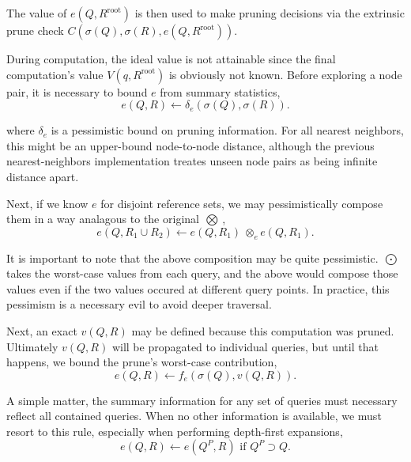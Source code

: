 \documentclass[twoside,leqno,twocolumn]{article}
\newcommand{\authornote}[1]{\footnote{Note to self: #1}}
\newcommand{\union}{\cup}
\newcommand{\summary}{\delta}
\newcommand{\kdroot}[1]{#1^{\text{root}}}
\newcommand{\kdparent}[1]{#1^{\!P}}
\newcommand{\nameOp}[2]{\mathop{#1\nolimits\!\!_{#2}}}
\newcommand{\nameop}[2]{{\scriptstyle\:}#1_{\!#2}}
\newcommand{\myOp}[1]{\nameOp{\bigotimes}{#1}}
\newcommand{\myop}[1]{\nameop{\otimes}{#1}}
\newcommand{\letterqr}{v}
\newcommand{\outqr}{V}
\newcommand{\Opqr}{\myOp{\letterqr}}
\newcommand{\inqrv}{v}
\newcommand{\lettermu}{e}
\newcommand{\inmu}{e}
\newcommand{\Outopmu}{\nameOp{\bigodot}{\lettermu}}%
\newcommand{\opmu}{\myop{\lettermu}}
\newcommand{\fmuv}{f_{\!\lettermu}}
\newcommand{\deltamu}{\summary_{\!\lettermu}}
\newcommand{\canprunemu}{C}
\newcommand{\outstat}{\sigma}
\begin{document}
\noindent
The value of $\inmu(Q, \kdroot{R})$ is then used to make pruning decisions via the extrinsic prune check $\canprunemu(\outstat(Q), \outstat(R), \inmu(Q, \kdroot{R}))$.

During computation, the ideal value is not attainable since the final computation's value $\outqr(q, \kdroot{R})$ is obviously not known.
Before exploring a node pair, it is necessary to bound $\inmu$ from summary statistics,
\begin{equation}
\inmu(Q, R) \gets \deltamu(\outstat(Q), \outstat(R)).
\label{eqn:mudelta}
\end{equation}

\noindent
where $\deltamu$ is a pessimistic bound on pruning information.
For all nearest neighbors, this might be an upper-bound node-to-node distance, although the previous nearest-neighbors implementation treates unseen node pairs as being infinite distance apart.

Next, if we know $\inmu$ for disjoint reference sets, we may pessimistically compose them in a way analagous to the original $\Opqr$,
\begin{equation}
\inmu(Q, R_1 \union R_2) \gets \inmu(Q, R_1) \opmu \inmu(Q, R_1).
\label{eqn:mucompose}
\end{equation}

\noindent
It is important to note that the above composition may be quite pessimistic.
$\Outopmu$ takes the worst-case values from each query, and the above would compose those values even if the two values occured at different query points.
In practice, this pessimism is a necessary evil to avoid deeper traversal.

Next, an exact $\inqrv(Q, R)$ may be defined because this computation was pruned.
Ultimately $\inqrv(Q, R)$ will be propagated to individual queries, but until that happens, we bound the prune's worst-case contribution,
\begin{equation}
\inmu(Q, R) \gets \fmuv(\outstat(Q), \inqrv(Q, R)).
\label{eqn:muprune}
\end{equation}

\noindent
A simple matter, the summary information for any set of queries must necessary reflect all contained queries.
When no other information is available, we must resort to this rule, especially when performing depth-first expansions,
\begin{equation}
\inmu(Q, R) \gets \inmu(\kdparent{Q}, R) \text{ if } \kdparent{Q} \supset Q.
\label{eqn:muparent}
\end{equation}
\end{document}
